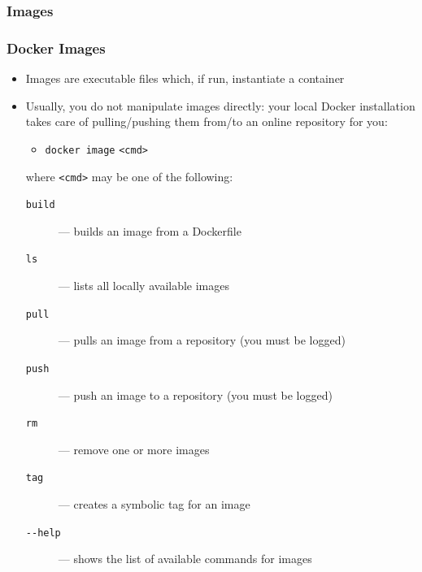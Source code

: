 \documentclass[presentation]{beamer}\mode<presentation>{\usetheme{AMSBolognaFC}}
\begin{document}
\subsubsection{Images}

\begin{frame}
\frametitle[Docker Images]{Docker Images}

\begin{itemize}
	\item Images are executable files which, if run, instantiate a container
	\item Usually, you do not manipulate images directly: your local Docker installation takes care of pulling/pushing them from/to an online \alert{repository} for you:
	\begin{itemize}
		\item[\$] \texttt{docker image} \texttt{\alert{<cmd>}}
	\end{itemize}
	where \texttt{<cmd>} may be one of the following:
	\begin{description}
		\item[\texttt{build}] --- builds an image from a \alert{Dockerfile}
		\item[\texttt{ls}] --- lists all locally available images
		\item[\texttt{pull}] --- pulls an image from a \alert{repository} (you must be logged)
		\item[\texttt{push}] --- push an image to a \alert{repository} (you must be logged)
		\item[\texttt{rm}] --- remove one or more images
		\item[\texttt{tag}] --- creates a symbolic tag for an image
		\item[\texttt{{-}-help}] --- shows the list of available commands for images

	\end{description}

\end{itemize}

\end{frame}
\end{document}
